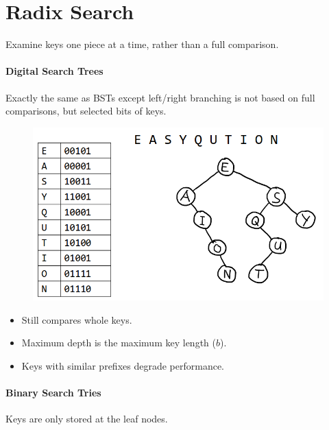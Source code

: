 \documentclass[twocolumn,english]{article}
\numberwithin{equation}{section}
\numberwithin{figure}{section}
\numberwithin{table}{section}
\begin{document}
\section{Radix Search}

Examine keys one piece at a time, rather than a full comparison.

\paragraph{Digital Search Trees}

Exactly the same as BSTs except left/right branching is not based
on full comparisons, but selected bits of keys.

\begin{figure}[H]
\centering{}\includegraphics[width=0.625\linewidth]{img/dst}
\end{figure}
\begin{itemize}
\item Still compares whole keys.
\item Maximum depth is the maximum key length ($b$).
\item Keys with similar prefixes degrade performance.
\end{itemize}

\paragraph{Binary Search Tries}

Keys are only stored at the leaf nodes.
\end{document}
